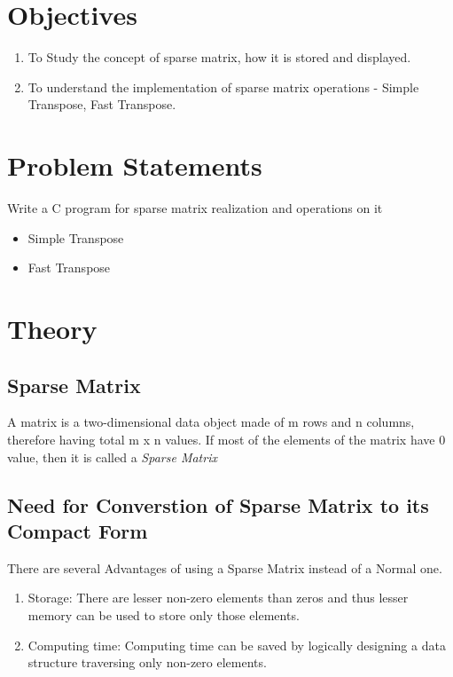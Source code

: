 \documentclass[11pt]{article}
\begin{document}
\tableofcontents
\thispagestyle{empty}
\clearpage


\setcounter{page}{1}

\section{Objectives}
\begin{enumerate}
	\item To Study the concept of sparse matrix, how it is stored and displayed.
	\item To understand the implementation of sparse matrix operations - Simple Transpose, Fast Transpose.
\end{enumerate}

\section{Problem Statements}
Write a C program for sparse matrix realization and operations on it
\begin{itemize}
	\item Simple Transpose
	\item Fast Transpose
\end{itemize}

\section{Theory}
\subsection{Sparse Matrix}
A matrix is a two-dimensional data object made of m rows and n columns, therefore having total m x n values. If most of the elements of the matrix have 0 value, then it is called a \textit{Sparse Matrix}


\subsection{Need for Converstion of Sparse Matrix to its Compact Form}
There are several Advantages of using a Sparse Matrix instead of a Normal one.

\begin{enumerate}
	\item Storage: There are lesser non-zero elements than zeros and thus lesser memory can be used to store only those elements.
	\item Computing time: Computing time can be saved by logically designing a data structure traversing only non-zero elements.
\end{enumerate}
\end{document}
